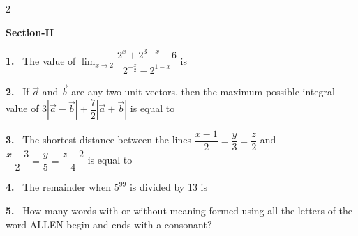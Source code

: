 \documentclass[10pt]{extarticle}
\newcommand{\sect}[1]{\par\smallskip\noindent\textbf{#1}\par}
\newcommand{\qn}[1]{\par\smallskip\noindent\textbf{#1.}~}
\begin{document}
\begin{multicols}{2}
\sect{Section-II}

\qn{1} The value of $\displaystyle\lim_{x\to2}\dfrac{2^x+2^{3-x}-6}{2^{-\frac{x}{2}}-2^{1-x}}$ is

\qn{2} If $\vec a$ and $\vec b$ are any two unit vectors, then the maximum possible integral value of $3|\vec a-\vec b|+\dfrac{7}{2}|\vec a+\vec b|$ is equal to

\qn{3} The shortest distance between the lines $\dfrac{x-1}{2}=\dfrac{y}{3}=\dfrac{z}{2}$ and $\dfrac{x-3}{2}=\dfrac{y}{5}=\dfrac{z-2}{4}$ is equal to

\qn{4} The remainder when $5^{99}$ is divided by 13 is

\qn{5} How many words with or without meaning formed using all the letters of the word ALLEN begin and ends with a consonant?

\end{multicols}
\end{document}
